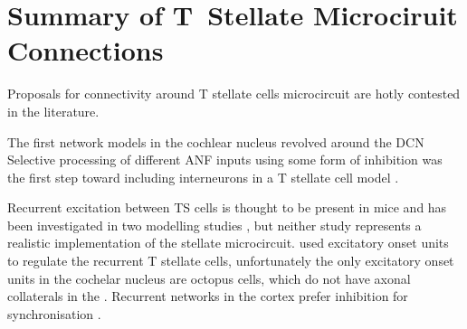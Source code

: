 \documentclass[10pt,a4paper,twoside,openright]{book}
\begin{document}







\section{Summary of T~Stellate Microciruit Connections}


Proposals for connectivity around T stellate cells microcircuit are hotly
contested in the literature.

The first network models in the cochlear nucleus revolved around the DCN
\citep{DavisVoigt:1991,ArleKim:1990,ArleKim:1991a,Arle:1992} Selective
processing of different ANF inputs using some form of inhibition was the first
step toward including interneurons in a T stellate cell model
\citep{LaiWinslowEtAl:1994,LaiWinslowEtAl:1994a}.

Recurrent excitation between TS cells is thought to be present in mice
\citep{FerragamoGoldingEtAl:1998a} and has been investigated in two modelling
studies \citep{BahmerLangner:2006,WiegrebeMeddis:2004}, but neither study
represents a realistic implementation of the stellate microcircuit.
\citet{BahmerLangner:2006} used excitatory onset units to regulate the recurrent
T stellate cells, unfortunately the only excitatory onset units in the cochelar
nucleus are octopus cells, which do not have axonal collaterals in the \VCN\@.
Recurrent networks in the cortex prefer inhibition for synchronisation
\citep{LyttonSejnowski:1991,BushSejnowski:1996}.


\begin{landscape}
{\small{}}
\end{landscape}

\end{document}

